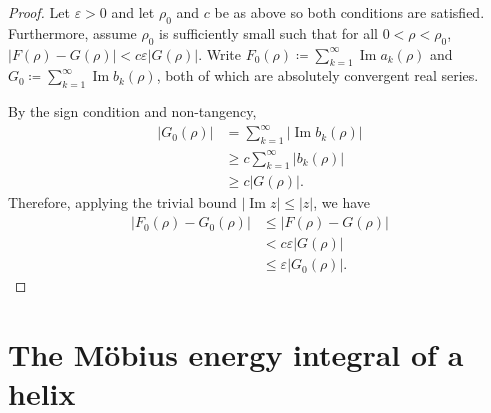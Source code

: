 \documentclass{amsart}
\theoremstyle{plain}
\numberwithin{theorem}{section}
\DeclareMathOperator{\Imz}{Im}
\theoremstyle{definition}
\theoremstyle{remark}
\theoremstyle{brakets}
\newcommand{\vep}{\varepsilon}
\begin{document}
\begin{proof}
    Let $\vep > 0$ and let $\rho_0$ and $c$ be as above so both conditions are satisfied. Furthermore, assume $\rho_0$ is sufficiently small such that for all $0 < \rho < \rho_0$, $|F(\rho) - G(\rho)| < c\vep |G(\rho)|.$ Write $F_0(\rho) \coloneq \sum\limits_{k=1}^\infty \Imz a_k(\rho)$ and $G_0 \coloneq \sum\limits_{k=1}^\infty \Imz b_k(\rho)$, both of which are absolutely convergent real series.

    By the sign condition and non-tangency,
    \begin{align*}
        |G_0(\rho)| &= \sum\limits_{k=1}^\infty \left|\Imz b_k(\rho) \right| \\
        &\geq c\sum\limits_{k=1}^\infty |b_k(\rho)| \\
        &\geq c|G(\rho)|.
    \end{align*}
    Therefore, applying the trivial bound $\left|\Imz z\right| \leq |z|$, we have
    \begin{align*}
        |F_0(\rho) - G_0(\rho)| &\leq |F(\rho) - G(\rho)| \\
        &< c\vep |G(\rho)| \\
        &\leq \vep |G_0(\rho)|.
    \end{align*}
\end{proof}

\section{The M\"obius energy integral of a helix}
\end{document}
